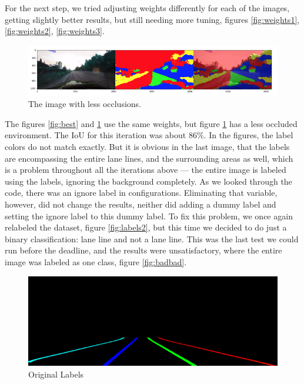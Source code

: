 \documentclass[twoside,twocolumn]{article}
\begin{document}
\par For the next step, we tried adjusting weights differently for each of the images, getting slightly better results, but still needing more tuning, figures \ref{fig:weights1}, \ref{fig:weights2}, \ref{fig:weights3}.

\begin{figure}
  \includegraphics[width=\linewidth]{6.png}
  \caption{The image with less occlusions.}
  \label{fig:occlusions}
\end{figure}

\par The figures \ref{fig:best} and \ref{fig:occlusions} use the same weights, but figure \ref{fig:occlusions} has a less occluded environment. The IoU for this iteration was about 86\%. In the figures, the label colors do not match exactly. But it is obvious in the last image, that the labels are encompassing the entire lane lines, and the surrounding areas as well, which is a problem throughout all the iterations above --- the entire image is labeled using the labels, ignoring the background completely. As we looked through the code, there was an ignore label in configurations. Eliminating that variable, however, did not change the results, neither did adding a dummy label and setting the ignore label to this dummy label. To fix this problem, we once again relabeled the dataset, figure \ref{fig:labels2}, but this time we decided to do just a binary classification: lane line and not a lane line. This was the last test we could run before the deadline, and the results were unsatisfactory, where the entire image was labeled as one class, figure \ref{fig:badbad}.

\begin{figure}
  \includegraphics[width=\linewidth]{7.png}
  \caption{Original Labels}
  \label{fig:labels1}
\end{figure}
\end{document}

